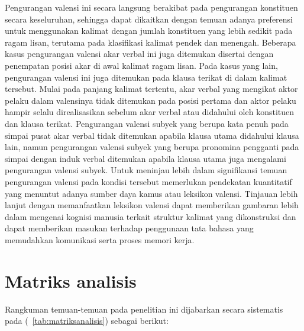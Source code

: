 Pengurangan valensi ini secara langsung berakibat pada pengurangan konstituen secara keseluruhan, sehingga dapat dikaitkan dengan temuan adanya preferensi untuk menggunakan kalimat dengan jumlah konstituen yang lebih sedikit pada ragam lisan, terutama pada klasifikasi kalimat pendek dan menengah. Beberapa kasus pengurangan valensi akar verbal ini juga ditemukan disertai dengan penempatan posisi akar di awal kalimat ragam lisan. Pada kasus yang lain, pengurangan valensi ini juga ditemukan pada klausa terikat di dalam kalimat tersebut. Mulai pada panjang kalimat tertentu, akar verbal yang mengikat aktor pelaku dalam valensinya tidak ditemukan pada posisi pertama dan aktor pelaku hampir selalu direalisasikan sebelum akar verbal atau didahului oleh konstituen dan klausa terikat. Pengurangan valensi subyek yang berupa kata penuh pada simpai pusat akar verbal tidak ditemukan apabila klausa utama didahului klausa lain, namun pengurangan valensi subyek yang berupa pronomina pengganti pada simpai dengan induk verbal ditemukan apabila klausa utama juga mengalami pengurangan valensi subyek. Untuk meninjau lebih dalam signifikansi temuan pengurangan valensi pada kondisi tersebut memerlukan pendekatan kuantitatif yang menuntut adanya sumber daya kamus atau leksikon valensi. Tinjauan lebih lanjut dengan memanfaatkan leksikon valensi dapat memberikan gambaran lebih dalam mengenai kognisi manusia terkait struktur kalimat yang dikonstruksi dan dapat memberikan masukan terhadap penggunaan tata bahasa yang memudahkan komunikasi serta proses memori kerja.

\section{Matriks analisis}
Rangkuman temuan-temuan pada penelitian ini dijabarkan secara sistematis pada (\tab~\ref{tab:matriksanalisis}) sebagai berikut:

